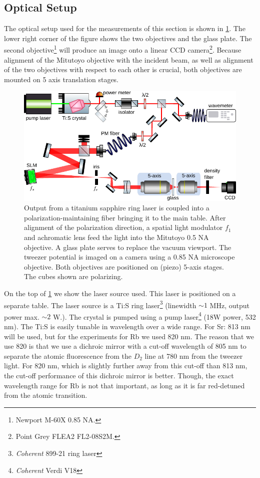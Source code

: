\subsection{Optical Setup}

The optical setup used for the measurements of this section is shown in \cref{fig:TiSandSLMsetup}. The lower right corner of the figure shows the two objectives and the glass plate. 
The second objective\footnote{Newport M-60X 0.85 NA.} will produce an image onto a linear \ac{CCD} camera\footnote{Point Grey FLEA2 FL2-08S2M.}. 
Because alignment of the Mitutoyo objective with the incident beam, as well as alignment of the two objectives with respect to each other is crucial, both objectives are mounted on 5 axis translation stages.

\begin{figure}
    \centering
    \includegraphics[width=\linewidth]{figures/TiSandSLM.pdf}
    \caption{Output from a titanium sapphire ring laser is coupled into a polarization-maintaining fiber bringing it to the main table. 
    After alignment of the polarization direction, a spatial light modulator $f_1$ and achromatic lens feed the light into the Mitutoyo 0.5 NA objective.
    A glass plate serves to replace the vacuum viewport.
    The tweezer potential is imaged on a camera using a 0.85 NA microscope objective.
    Both objectives are positioned on (piezo) 5-axis stages.
    The cubes shown are polarizing.}
    \label{fig:TiSandSLMsetup}
\end{figure}
On the top of \cref{fig:TiSandSLMsetup} we show the laser source used.
This laser is positioned on a separate table. 
The laser source is a \ac{Ti:S} ring laser\footnote{\textit{Coherent} 899-21 ring laser} (linewidth $\sim 1$ MHz, output power max. $\sim 2$ W.). 
The crystal is pumped using a pump laser\footnote{\textit{Coherent} Verdi V18} (18W power, 532 nm).
The \ac{Ti:S} is easily tunable in wavelength over a wide range. For Sr: 813 nm will be used, but for the experiments for Rb we used 820 nm. 
The reason that we use 820 is that we use a dichroic mirror with a cut-off wavelength of 805 nm to separate the atomic fluorescence from the $D_2$ line at 780 nm from the tweezer light. 
For 820 nm, which is slightly further away from this cut-off than 813 nm, the cut-off performance of this dichroic mirror is better.
Though, the exact wavelength range for Rb is not that important, as long as it is far red-detuned from the atomic transition.

